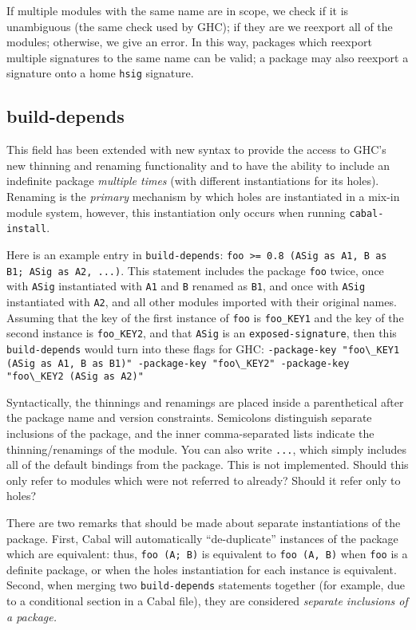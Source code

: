 \documentclass{article}
\newcommand{\Red}[1]{{\color{red} #1}}
\begin{document}
If multiple modules with the same name are in scope, we check
if it is unambiguous (the same check used by GHC); if they are
we reexport all of the modules; otherwise, we give an error.
In this way, packages which reexport multiple signatures to the
same name can be valid; a package may also reexport a signature
onto a home \texttt{hsig} signature.

\subsection{build-depends}

This field has been extended with new syntax
to provide the access to GHC's new thinning and renaming functionality
and to have the ability to include an indefinite package \emph{multiple times}
(with different instantiations for its holes).  Renaming is the
\emph{primary} mechanism by which holes are instantiated in a mix-in module
system, however, this instantiation only occurs when running \texttt{cabal-install}.

Here is an example entry in \texttt{build-depends}:
\verb|foo >= 0.8 (ASig as A1, B as B1; ASig as A2, ...)|.  This statement includes the
package \texttt{foo} twice, once with \texttt{ASig} instantiated with
\texttt{A1} and \texttt{B} renamed as \texttt{B1}, and once with
\texttt{ASig} instantiated with \texttt{A2}, and all other modules
imported with their original names.  Assuming that the key of the first
instance of \texttt{foo} is \texttt{foo\_KEY1} and the key of the second instance
is \texttt{foo\_KEY2}, and that \texttt{ASig} is an \texttt{exposed-signature}, then this \texttt{build-depends} would turn into
these flags for GHC\@: \verb|-package-key "foo\_KEY1 (ASig as A1, B as B1)" -package-key "foo\_KEY2" -package-key "foo\_KEY2 (ASig as A2)"|

Syntactically, the thinnings and renamings are placed inside a
parenthetical after the package name and version constraints.
Semicolons distinguish separate inclusions of the package, and the inner
comma-separated lists indicate the thinning/renamings of the module.
You can also write \verb|...|, which simply
includes all of the default bindings from the package.
\Red{This is not implemented. Should this only refer to modules which were not referred to already? Should it refer only to holes?}

There are two remarks that should be made about separate instantiations of
the package.  First, Cabal will automatically ``de-duplicate'' instances of
the package which are equivalent: thus, \verb|foo (A; B)| is equivalent to
\texttt{foo (A, B)} when \texttt{foo} is a definite package, or when the
holes instantiation for each instance is equivalent.  Second, when merging
two \texttt{build-depends} statements together (for example, due to
a conditional section in a Cabal file), they are considered \emph{separate
inclusions of a package.}
\end{document}
